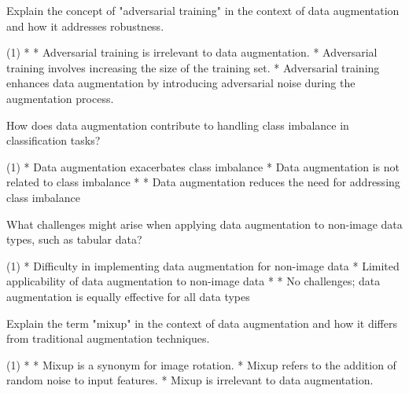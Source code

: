 \documentclass[10pt]{extarticle}
\begin{document}
\begin{exercise}
    Explain the concept of "adversarial training" in the context of data augmentation and how it addresses robustness.
    \begin{choice} (1)
        * 
        * Adversarial training is irrelevant to data augmentation.
        * Adversarial training involves increasing the size of the training set.
        * Adversarial training enhances data augmentation by introducing adversarial noise during the augmentation process.
    \end{choice}
\end{exercise}
\begin{solution}
\end{solution}

\begin{exercise}
    How does data augmentation contribute to handling class imbalance in classification tasks?
    \begin{choice} (1)
        * Data augmentation exacerbates class imbalance
        * Data augmentation is not related to class imbalance
        * 
        * Data augmentation reduces the need for addressing class imbalance
    \end{choice}
\end{exercise}
\begin{solution}
\end{solution}

\begin{exercise}
    What challenges might arise when applying data augmentation to non-image data types, such as tabular data?
    \begin{choice}(1)
        * Difficulty in implementing data augmentation for non-image data
        * Limited applicability of data augmentation to non-image data
        * 
        * No challenges; data augmentation is equally effective for all data types
    \end{choice}
\end{exercise}
\begin{solution}
\end{solution}

\begin{exercise}
    Explain the term "mixup" in the context of data augmentation and how it differs from traditional augmentation techniques.
    \begin{choice}(1)
        * 
        * Mixup is a synonym for image rotation.
        * Mixup refers to the addition of random noise to input features.
        * Mixup is irrelevant to data augmentation.
    \end{choice}
\end{exercise}
\begin{solution}
\end{solution}
\end{document}
